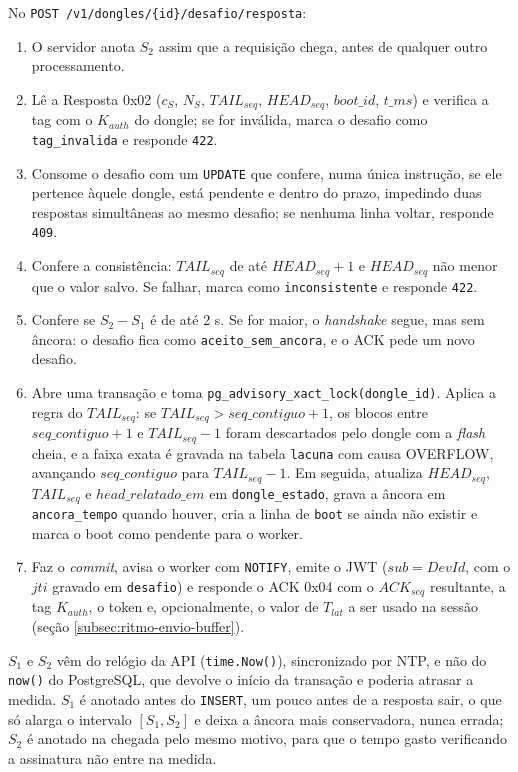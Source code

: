 \documentclass[
	12pt,
	article,			%
	oneside,
	a4paper,
	english,
	brazil				%
	]{abntex2}
\begin{document}
No \texttt{POST /v1/dongles/\{id\}/desafio/resposta}:

\begin{enumerate}
	\item O servidor anota $S_2$ assim que a requisição chega, antes de qualquer outro processamento.
	\item Lê a Resposta 0x02 ($c_S$, $N_S$, $TAIL_{seq}$, $HEAD_{seq}$, $boot\_id$, $t\_ms$) e verifica a tag com o $K_{auth}$ do
	dongle; se for inválida, marca o desafio como \texttt{tag\_invalida} e responde \texttt{422}.
	\item Consome o desafio com um \texttt{UPDATE} que confere, numa única instrução, se ele pertence àquele dongle, está pendente e
	dentro do prazo, impedindo duas respostas simultâneas ao mesmo desafio; se nenhuma linha voltar, responde \texttt{409}.
	\item Confere a consistência: $TAIL_{seq}$ de até $HEAD_{seq} + 1$ e $HEAD_{seq}$ não menor que o valor salvo. Se falhar, marca
	como \texttt{inconsistente} e responde \texttt{422}.
	\item Confere se $S_2 - S_1$ é de até 2 s. Se for maior, o \textit{handshake} segue, mas sem âncora: o desafio fica como
	\texttt{aceito\_sem\_ancora}, e o ACK pede um novo desafio.
	\item Abre uma transação e toma \texttt{pg\_advisory\_xact\_lock(dongle\_id)}. Aplica a regra do $TAIL_{seq}$: se
	$TAIL_{seq} > seq\_contiguo + 1$, os blocos entre $seq\_contiguo + 1$ e $TAIL_{seq} - 1$ foram descartados pelo dongle com a
	\textit{flash} cheia, e a faixa exata é gravada na tabela \texttt{lacuna} com causa OVERFLOW, avançando $seq\_contiguo$ para $TAIL_{seq} - 1$.
	Em seguida, atualiza $HEAD_{seq}$, $TAIL_{seq}$ e $head\_relatado\_em$ em \texttt{dongle\_estado}, grava a âncora em
	\texttt{ancora\_tempo} quando houver, cria a linha de \texttt{boot} se ainda não existir e marca o boot como pendente para o
	worker.
	\item Faz o \textit{commit}, avisa o worker com \texttt{NOTIFY}, emite o JWT ($sub = DevId$, com o $jti$ gravado em
	\texttt{desafio}) e responde o ACK 0x04 com o $ACK_{seq}$ resultante, a tag $K_{auth}$, o token e, opcionalmente, o valor de
	$T_{lat}$ a ser usado na sessão (seção \ref{subsec:ritmo-envio-buffer}).
\end{enumerate}

$S_1$ e $S_2$ vêm do relógio da API (\texttt{time.Now()}), sincronizado por NTP, e não do \texttt{now()} do PostgreSQL, que devolve o
início da transação e poderia atrasar a medida. $S_1$ é anotado antes do \texttt{INSERT}, um pouco antes de a resposta sair, o que só
alarga o intervalo $[S_1, S_2]$ e deixa a âncora mais conservadora, nunca errada; $S_2$ é anotado na chegada pelo mesmo motivo, para
que o tempo gasto verificando a assinatura não entre na medida.
\end{document}
